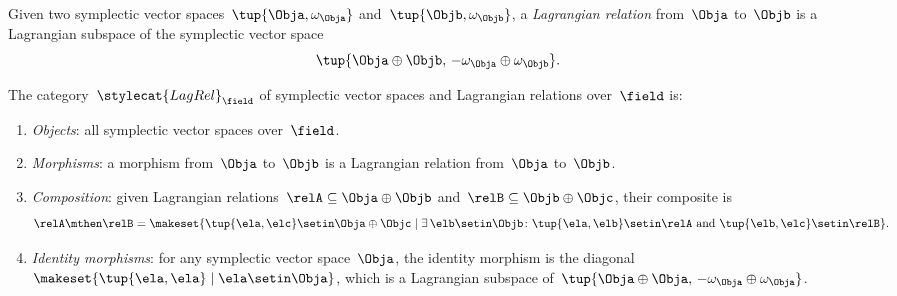 {\begin{ctdefinition}
    Given two symplectic vector spaces~$\tup{\Obja, \omega_\Obja}$ and~$\tup{\Objb, \omega_\Objb}$, a \emph{Lagrangian relation} from~$\Obja$ to~$\Objb$ is a Lagrangian subspace of the symplectic vector space
    $$\tup{\Obja \oplus \Objb,\, -\omega_\Obja \oplus \omega_\Objb}.$$

    The category~$\stylecat{LagRel}_\field$ of symplectic vector spaces and Lagrangian relations over~$\field$ is:
    \begin{enumerate}
        \item \emph{Objects}: all symplectic vector spaces over~$\field$.
        \item \emph{Morphisms}: a morphism from~$\Obja$ to~$\Objb$ is a Lagrangian relation from~$\Obja$ to~$\Objb$.
        \item \emph{Composition}: given Lagrangian relations~$\relA \subseteq \Obja \oplus \Objb$ and~$\relB \subseteq \Objb \oplus \Objc$, their composite is
              \begin{equation}
                  \relA \mthen \relB = \makeset{ \tup{\ela, \elc} \setin \Obja \oplus \Objc \mid \exists\, \elb \setin \Objb \colon \tup{\ela, \elb} \setin \relA \text{ and } \tup{\elb, \elc} \setin \relB }.
              \end{equation}
        \item \emph{Identity morphisms}: for any symplectic vector space~$\Obja$, the identity morphism is the diagonal~$\makeset{ \tup{\ela, \ela} \mid \ela \setin \Obja }$, which is a Lagrangian subspace of~$\tup{\Obja \oplus \Obja,\, -\omega_\Obja \oplus \omega_\Obja}$.
    \end{enumerate}
\end{ctdefinition}


}

